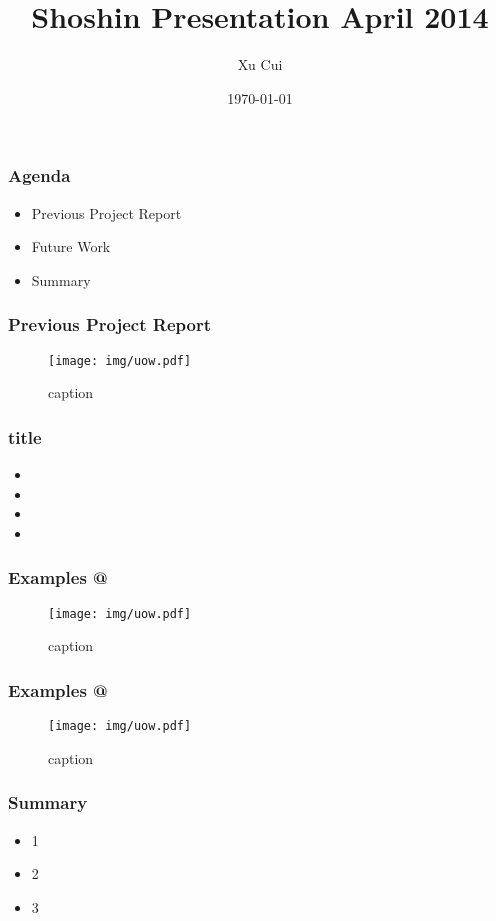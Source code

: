 \documentclass{beamer}
\title[]{Shoshin Presentation April 2014}
\author[Xu Cui]{Xu Cui}
\institute{\texttt{[image: img/UniversityOfWaterloo\_logo\_vert\_rgb.png]}}
\date{{\tiny\today}}
\makeatletter
\newcommand*{\rom}[1]{\expandafter\@slowromancap\romannumeral #1@}
\makeatother
\begin{document}
\begin{frame}
  \titlepage
\end{frame}


\begin{frame}
  \frametitle{Agenda}
  \begin{itemize}
  \item Previous Project Report
  \item Future Work
  \item Summary
  \end{itemize}
\end{frame}


\begin{frame}
  \frametitle{Previous Project Report}
  \begin{figure}
  	\centering
  	\texttt{[image: img/uow.pdf]}
  	\caption{caption}
  \end{figure}
\end {frame}


\begin{frame}
  \frametitle{title}
  \begin{itemize}
  \item
  \item
  \item
  \item
  \end{itemize}
\end{frame}


\begin{frame}
  \frametitle{Examples \rom{1}}
  \begin{figure}
  	\centering
  	\texttt{[image: img/uow.pdf]}
  	\caption{caption}
  \end{figure}
\end {frame}

\begin{frame}
  \frametitle{Examples \rom{2}}
  \begin{figure}
  	\centering
  	\texttt{[image: img/uow.pdf]}
  	\caption{caption}
  \end{figure}
\end {frame}



\begin{frame}
  \frametitle{Summary}
  \begin{itemize}
  \item 1
  \item 2
  \item 3
  \end{itemize}
\end {frame}
\end{document}
